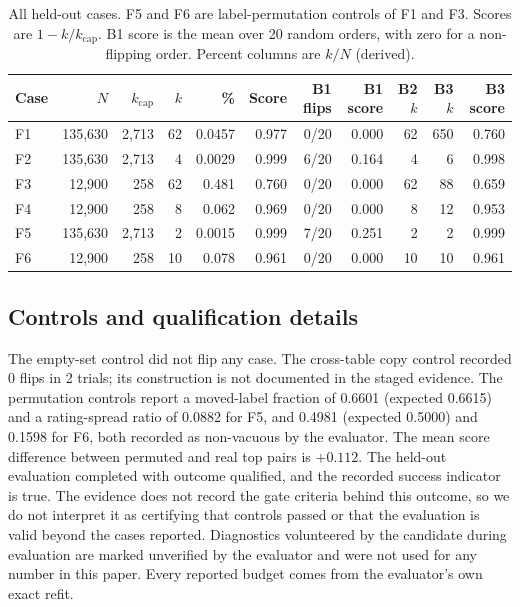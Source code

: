 \documentclass{article}
\newcommand{\kcap}{k_{\mathrm{cap}}}
\begin{document}
\begin{table}[h]
\centering
\caption{All held-out cases. F5 and F6 are label-permutation controls of F1 and F3. Scores are $1-k/\kcap$. B1 score is the mean over 20 random orders, with zero for a non-flipping order. Percent columns are $k/N$ (derived).}
\label{tab:full}
\footnotesize
\setlength{\tabcolsep}{4pt}
\begin{tabular}{lrrrrrrrrrr}
\toprule
Case & $N$ & $\kcap$ & $k$ & \% & Score & B1 flips & B1 score & B2 $k$ & B3 $k$ & B3 score\\
\midrule
F1 & 135,630 & 2,713 & 62 & 0.0457 & 0.977 & 0/20 & 0.000 & 62 & 650 & 0.760\\
F2 & 135,630 & 2,713 & 4 & 0.0029 & 0.999 & 6/20 & 0.164 & 4 & 6 & 0.998\\
F3 & 12,900 & 258 & 62 & 0.481 & 0.760 & 0/20 & 0.000 & 62 & 88 & 0.659\\
F4 & 12,900 & 258 & 8 & 0.062 & 0.969 & 0/20 & 0.000 & 8 & 12 & 0.953\\
F5 & 135,630 & 2,713 & 2 & 0.0015 & 0.999 & 7/20 & 0.251 & 2 & 2 & 0.999\\
F6 & 12,900 & 258 & 10 & 0.078 & 0.961 & 0/20 & 0.000 & 10 & 10 & 0.961\\
\bottomrule
\end{tabular}
\end{table}

\subsection{Controls and qualification details}
The empty-set control did not flip any case. The cross-table copy control recorded 0 flips in 2 trials; its construction is not documented in the staged evidence. The permutation controls report a moved-label fraction of 0.6601 (expected 0.6615) and a rating-spread ratio of 0.0882 for F5, and 0.4981 (expected 0.5000) and 0.1598 for F6, both recorded as non-vacuous by the evaluator. The mean score difference between permuted and real top pairs is $+0.112$. %
The held-out evaluation completed with outcome qualified, and the recorded success indicator is true. The evidence does not record the gate criteria behind this outcome, so we do not interpret it as certifying that controls passed or that the evaluation is valid beyond the cases reported. %
Diagnostics volunteered by the candidate during evaluation are marked unverified by the evaluator and were not used for any number in this paper. Every reported budget comes from the evaluator's own exact refit.
\end{document}

